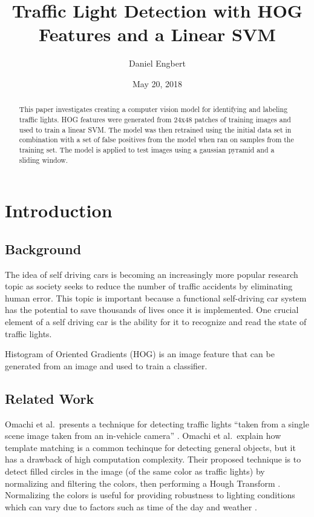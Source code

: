 \documentclass[a4paper]{article}
\title{Traffic Light Detection with HOG Features and a Linear SVM}
\author{Daniel Engbert}
\date{May 20, 2018}
\begin{document}
\maketitle

\begin{abstract}
    This paper investigates creating a computer vision model for identifying and labeling traffic lights.  HOG features were generated from 24x48 patches of training images and used to train a linear SVM.  The model was then retrained using the initial data set in combination with a set of false positives from the model when ran on samples from the training set.  The model is applied to test images using a gaussian pyramid and a sliding window.
\end{abstract}

\section{Introduction}
\label{sec:theory}
\subsection{Background}
The idea of self driving cars is becoming an increasingly more popular research topic as society seeks to reduce the number of traffic accidents by eliminating human error.  This topic is important because a functional self-driving car system has the potential to save thousands of lives once it is implemented.  One crucial element of a self driving car is the ability for it to recognize and read the state of traffic lights.

Histogram of Oriented Gradients (HOG) is an image feature that can be generated from an image and used to train a classifier.


\subsection{Related Work}
Omachi et al.\ presents a technique for detecting traffic lights ``taken from a single scene image taken from an in-vehicle camera'' \cite{omachi}.  Omachi et al.\ explain how template matching is a common techinque for detecting general objects, but it has a drawback of high computation complexity.  Their proposed technique is to detect filled circles in the image (of the same color as traffic lights) by normalizing and filtering the colors, then performing a Hough Transform \cite{omachi}.  Normalizing the colors is useful for providing robustness to lighting conditions which can vary due to factors such as time of the day and weather \cite{omachi}.
\end{document}
